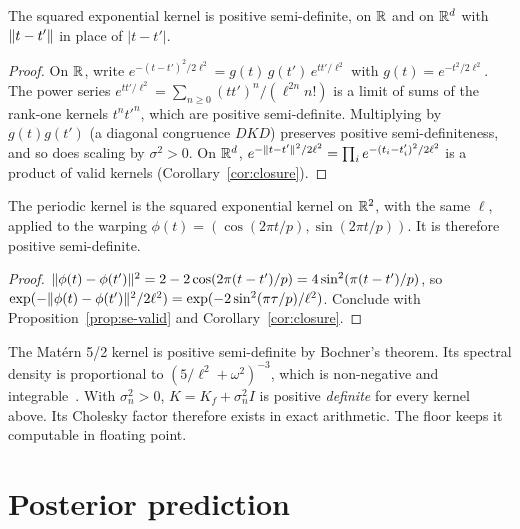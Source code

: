 \documentclass[11pt,a4paper]{article}
\begin{document}
\begin{proposition}\label{prop:se-valid}
The squared exponential kernel is positive semi-definite, on $\mathbb{R}$ and on $\mathbb{R}^d$ with
$\lVert t-t'\rVert$ in place of $|t-t'|$.
\end{proposition}
\begin{proof}
On $\mathbb{R}$, write
$e^{-(t-t')^2/2\ell^2} = g(t)\,g(t')\,e^{tt'/\ell^2}$ with $g(t)=e^{-t^2/2\ell^2}$. The
power series $e^{tt'/\ell^2}=\sum_{n\ge0}(tt')^n/(\ell^{2n}n!)$ is a limit of sums of
the rank-one kernels $t^nt'^n$, which are positive semi-definite. Multiplying by
$g(t)g(t')$ (a diagonal congruence $DKD$) preserves positive semi-definiteness, and so does scaling by $\sigma^2>0$. On
$\mathbb{R}^d$, $e^{-\lVert t-t'\rVert^2/2\ell^2}=\prod_{i}e^{-(t_i-t_i')^2/2\ell^2}$ is a product of
valid kernels (Corollary~\ref{cor:closure}).
\end{proof}

\begin{proposition}\label{prop:periodic-valid}
The periodic kernel is the squared exponential kernel on $\mathbb{R}^2$, with the same $\ell$, applied
to the warping $\phi(t)=(\cos(2\pi t/p),\sin(2\pi t/p))$. It is therefore positive semi-definite.
\end{proposition}
\begin{proof}
$\lVert \phi(t)-\phi(t')\rVert^2 = 2-2\cos(2\pi(t-t')/p) = 4\sin^2(\pi(t-t')/p)$, so
$\exp(-\lVert \phi(t)-\phi(t')\rVert^2/2\ell^2)=\exp(-2\sin^2(\pi\tau/p)/\ell^2)$. Conclude with
Proposition~\ref{prop:se-valid} and Corollary~\ref{cor:closure}.
\end{proof}

The Matérn 5/2 kernel is positive semi-definite by Bochner's theorem. Its spectral
density is proportional to $(5/\ell^2+\omega^2)^{-3}$, which is non-negative and
integrable~\cite{rasmussen2006}. With $\sigma_n^2>0$, $K=K_f+\sigma_n^2I$ is positive
\emph{definite} for every kernel above. Its Cholesky factor therefore exists in exact
arithmetic. The floor  keeps it computable in floating
point.

\section{Posterior prediction}
\end{document}

